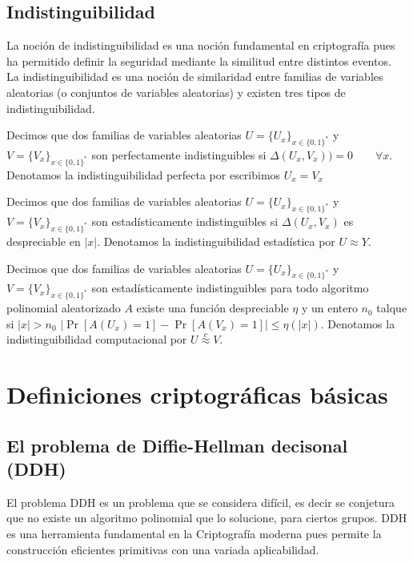 \subsection{Indistinguibilidad}
La noción de indistinguibilidad es una noción fundamental en criptografía
pues ha permitido definir la seguridad mediante la similitud entre distintos
eventos.\\
La indistinguibilidad es una noción
de similaridad entre familias de variables aleatorias (o conjuntos
de variables aleatorias) y existen tres tipos de indistinguibilidad.

\begin{definicion}
Decimos que dos familias de variables aleatorias $U=\{U_x\}_{x\in\{0,1\}^*}$
y $V=\{V_x\}_{x\in\{0,1\}^*}$ son perfectamente indistinguibles
si $\Delta(U_x, V_x)) = 0 \qquad \forall x$.
Denotamos la indistinguibilidad perfecta por escribimos $U_x = V_x$
\end{definicion}

\begin{definicion}
Decimos que dos familias de variables aleatorias $U=\{U_x\}_{x\in\{0,1\}^*}$ y 
$V=\{V_x\}_{x\in\{0,1\}^*}$ son estadísticamente indistinguibles
si $\Delta(U_x, V_x)$ es despreciable en $|x|$. Denotamos la indistinguibilidad estadística
por $U \approx Y$.
\end{definicion}

\begin{definicion}
Decimos que dos familias de variables aleatorias $U=\{U_x\}_{x\in\{0,1\}^*}$ y
$V=\{V_x\}_{x\in\{0,1\}^*}$ son estadísticamente indistinguibles
para todo algoritmo polinomial aleatorizado $A$ existe una función despreciable
$\eta$ y un entero $n_0$ talque si $|x| > n_0$
$|\Pr[A(U_x)=1] - \Pr[A(V_x)=1]| \leq \eta(|x|)$. Denotamos la indistinguibilidad
computacional por $U \overset{c}{\approx} V$.
\end{definicion}

\section{Definiciones criptográficas básicas}

\subsection{El problema de Diffie-Hellman decisonal (DDH)}
El problema DDH \cite{diffie-hellman_me:1976a} es un problema que se considera
difícil, es decir se conjetura
que no existe un algoritmo polinomial que lo solucione, para ciertos
grupos. DDH es una herramienta fundamental en la Criptografía moderna pues
permite la construcción eficientes primitivas con una variada aplicabilidad.


